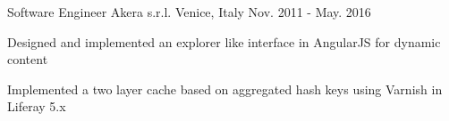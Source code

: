 \begin{cventries}
  \cventry
    {Software Engineer} %
    {Akera s.r.l.} %
    {Venice, Italy} %
    {Nov. 2011 - May. 2016} %
    {
      \begin{cvitems} %
        \item {Designed and implemented an explorer like interface in AngularJS for dynamic content}
        \item {Implemented a two layer cache based on aggregated hash keys using Varnish in Liferay 5.x}
      \end{cvitems}
    }

\end{cventries}
